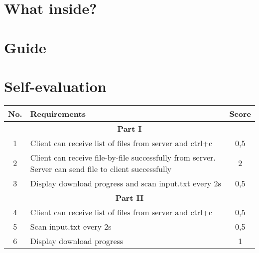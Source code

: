 \documentclass[a4paper,12pt]{report}
\begin{document}
\pagebreak
\section{What inside?}

\pagebreak
\section{Guide}

\pagebreak
\section{Self-evaluation}
\begin{center}
  \renewcommand{\arraystretch}{1.5}
  \begin{tabular}{|c|p{}|c|}
    \hline
    \textbf{No.}                           & \textbf{Requirements}                                                                                 & \textbf{Score} \\\hline
    \multicolumn{3}{|c|}{\textbf{Part I}}                                                                                                                           \\\hline
    1                                      & Client can receive list of files from server and ctrl+c                                               & 0,5            \\\hline
    2                                      & Client can receive file-by-file successfully from server. Server can send file to client successfully & 2              \\\hline
    3                                      & Display download progress and scan input.txt every 2s                                                 & 0,5            \\\hline
    \multicolumn{3}{|c|}{\textbf{Part II}}                                                                                                                          \\\hline
    4                                      & Client can receive list of files from server and ctrl+c                                               & 0,5            \\\hline
    5                                      & Scan input.txt every 2s                                                                               & 0,5            \\\hline
    6                                      & Display download progress                                                                             & 1              \\\hline

\end{tabular}
\end{center}
\end{document}
